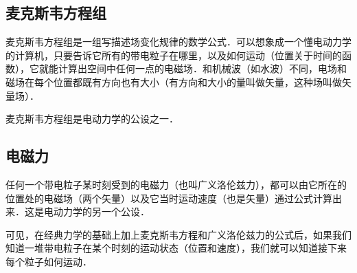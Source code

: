 \subsection{麦克斯韦方程组}
麦克斯韦方程组是一组写描述场变化规律的数学公式．可以想象成一个懂电动力学的计算机，只要告诉它所有的带电粒子在哪里，以及如何运动（位置关于时间的函数），它就能计算出空间中任何一点的电磁场．和机械波（如水波）不同，电场和磁场在每个位置都既有方向也有大小（有方向和大小的量叫做矢量，这种场叫做矢量场）．

麦克斯韦方程组是电动力学的公设之一．

\subsection{电磁力}
任何一个带电粒子某时刻受到的电磁力（也叫广义洛伦兹力），都可以由它所在的位置处的电磁场（两个矢量）以及它当时运动速度（也是矢量）通过公式计算出来．这是电动力学的另一个公设．

可见，在经典力学的基础上加上麦克斯韦方程和广义洛伦兹力的公式后，如果我们知道一堆带电粒子在某个时刻的运动状态（位置和速度），我们就可以知道接下来每个粒子如何运动．
